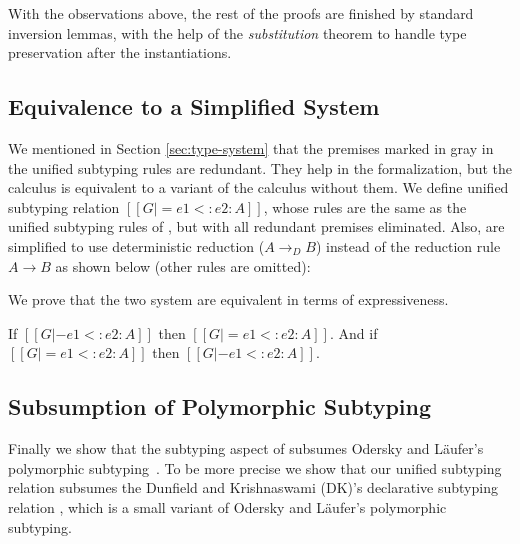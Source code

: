 With the observations above, the rest of the proofs are finished by standard
inversion lemmas, with the help of the \emph{substitution} theorem to handle type
preservation after the instantiations.

\subsection{Equivalence to a Simplified System}
We mentioned in Section \ref{sec:type-system} that the premises marked in gray in the
unified subtyping rules are redundant. They help in the formalization, but the calculus
is equivalent to a variant of the calculus without them. We define unified subtyping relation
$[[G |= e1 <: e2 : A]]$, whose rules are the same as the unified subtyping rules of \name,
but with all redundant premises eliminated. Also, 
are simplified to use deterministic reduction ($A \longrightarrow_D B$)
instead of the reduction rule $A \longrightarrow B$ as shown below
(other rules are omitted):


We prove that the two system are equivalent in terms of expressiveness.

\begin{theorem}
  If $[[G |- e1 <: e2 : A]]$ then $[[G |= e1 <: e2 : A]]$.
  And if $[[G |= e1 <: e2 : A]]$ then $[[G |- e1 <: e2 : A]]$.
\end{theorem}

\subsection{Subsumption of Polymorphic Subtyping}

Finally we show that the subtyping aspect of \name subsumes
Odersky and L\"aufer's polymorphic
subtyping~\cite{odersky1996putting}. To be more precise 
we show that our unified subtyping relation subsumes the Dunfield and Krishnaswami (DK)'s declarative
subtyping relation \cite{dunfield2013complete}, which is a small variant of
Odersky and L\"aufer's polymorphic subtyping.

